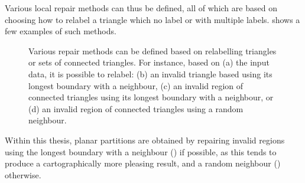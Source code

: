 Various local repair methods can thus be defined, all of which are based on choosing how to relabel a triangle which no label or with multiple labels.
 shows a few examples of such methods.
\begin{figure}
\quad
{}
\quad
{}
\quad
{}
\caption[Various repair methods based on relabelling (sets of) triangles]{Various repair methods can be defined based on relabelling triangles or sets of connected triangles.
For instance, based on (a) the input data, it is possible to relabel: (b) an invalid triangle based using its longest boundary with a neighbour, (c) an invalid region of connected triangles using its longest boundary with a neighbour, or (d) an invalid region of connected triangles using a random neighbour.}
\label{fig:prepair-method}
\end{figure}
Within this thesis, planar partitions are obtained by repairing invalid regions using the longest boundary with a neighbour () if possible, as this tends to produce a cartographically more pleasing result, and a random neighbour () otherwise.

